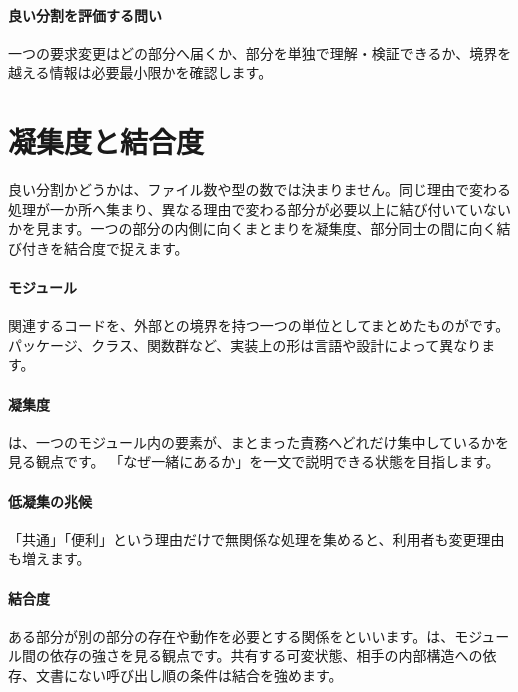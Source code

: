 \par
\endgroup
  \vspace{5mm}
\paragraph{良い分割を評価する問い}
    一つの要求変更はどの部分へ届くか、部分を単独で理解・検証できるか、境界を越える情報は必要最小限かを確認します。

\par
\endgroup


\section{凝集度と結合度}
\label{sec:04-software-engineering-04}

良い分割かどうかは、ファイル数や型の数では決まりません。同じ理由で変わる処理が一か所へ集まり、異なる理由で変わる部分が必要以上に結び付いていないかを見ます。一つの部分の内側に向くまとまりを凝集度、部分同士の間に向く結び付きを結合度で捉えます。

\begingroup
\begingroup
\paragraph{モジュール}
        関連するコードを、外部との境界を持つ一つの単位としてまとめたものがです。
        パッケージ、クラス、関数群など、実装上の形は言語や設計によって異なります。

\paragraph{凝集度}
        は、一つのモジュール内の要素が、まとまった責務へどれだけ集中しているかを見る観点です。
        「なぜ一緒にあるか」を一文で説明できる状態を目指します。

\paragraph{低凝集の兆候}
        「共通」「便利」という理由だけで無関係な処理を集めると、利用者も変更理由も増えます。

\par
\endgroup
\medskip
\begingroup
\paragraph{結合度}
        ある部分が別の部分の存在や動作を必要とする関係をといいます。は、モジュール間の依存の強さを見る観点です。共有する可変状態、相手の内部構造への依存、文書にない呼び出し順の条件は結合を強めます。

